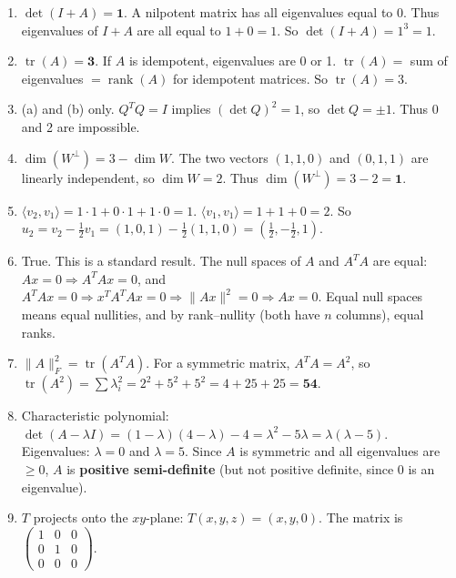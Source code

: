 \documentclass[11pt]{article}
\DeclareMathOperator{\tr}{tr}
\DeclareMathOperator{\rank}{rank}
\begin{document}
\begin{enumerate}
\item $\det(I+A)=\mathbf{1}$. A nilpotent matrix has all eigenvalues equal to 0. Thus eigenvalues of $I+A$ are all equal to $1+0=1$. So $\det(I+A)=1^3=1$.

\item $\tr(A)=\mathbf{3}$. If $A$ is idempotent, eigenvalues are 0 or 1. $\tr(A)=$ sum of eigenvalues $=\rank(A)$ for idempotent matrices. So $\tr(A)=3$.

\item (a) and (b) only. $Q^TQ=I$ implies $(\det Q)^2=1$, so $\det Q=\pm 1$. Thus 0 and 2 are impossible.

\item $\dim(W^\perp)=3-\dim W$. The two vectors $(1,1,0)$ and $(0,1,1)$ are linearly independent, so $\dim W=2$. Thus $\dim(W^\perp)=3-2=\mathbf{1}$.

\item $\langle v_2,v_1\rangle = 1\cdot 1+0\cdot 1+1\cdot 0=1$. $\langle v_1,v_1\rangle=1+1+0=2$. So $u_2=v_2-\frac{1}{2}v_1=(1,0,1)-\frac{1}{2}(1,1,0)=\left(\frac{1}{2},-\frac{1}{2},1\right)$.

\item True. This is a standard result. The null spaces of $A$ and $A^TA$ are equal: $Ax=0\Rightarrow A^TAx=0$, and $A^TAx=0\Rightarrow x^TA^TAx=0\Rightarrow\|Ax\|^2=0\Rightarrow Ax=0$. Equal null spaces means equal nullities, and by rank--nullity (both have $n$ columns), equal ranks.

\item $\|A\|^2_F=\tr(A^TA)$. For a symmetric matrix, $A^TA=A^2$, so $\tr(A^2)=\sum\lambda_i^2=2^2+5^2+5^2=4+25+25=\mathbf{54}$.

\item Characteristic polynomial: $\det(A-\lambda I)=(1-\lambda)(4-\lambda)-4=\lambda^2-5\lambda=\lambda(\lambda-5)$. Eigenvalues: $\lambda=0$ and $\lambda=5$. Since $A$ is symmetric and all eigenvalues are $\ge 0$, $A$ is \textbf{positive semi-definite} (but not positive definite, since $0$ is an eigenvalue).

\item $T$ projects onto the $xy$-plane: $T(x,y,z)=(x,y,0)$. The matrix is $\begin{pmatrix}1&0&0\\0&1&0\\0&0&0\end{pmatrix}$.

\end{enumerate}
\end{document}
